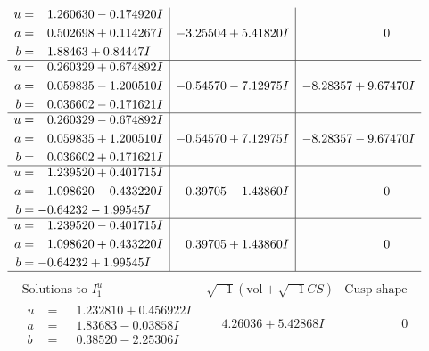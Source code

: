 \documentclass[1p]{elsarticle_modified}
\theoremstyle{definition}
\newcommand{\I}{\sqrt{-1}}
\begin{document}
$$\begin{array}{c|c|c}
\begin{aligned}
u &= \phantom{-}1.260630 - 0.174920 I \\
a &= \phantom{-}0.502698 + 0.114267 I \\
b &= \phantom{-}1.88463 + 0.84447 I\end{aligned}
 & -3.25504 + 5.41820 I & \phantom{-0.000000 } 0 \\ \hline\begin{aligned}
u &= \phantom{-}0.260329 + 0.674892 I \\
a &= \phantom{-}0.059835 - 1.200510 I \\
b &= \phantom{-}0.036602 - 0.171621 I\end{aligned}
 & -0.54570 - 7.12975 I & -8.28357 + 9.67470 I \\ \hline\begin{aligned}
u &= \phantom{-}0.260329 - 0.674892 I \\
a &= \phantom{-}0.059835 + 1.200510 I \\
b &= \phantom{-}0.036602 + 0.171621 I\end{aligned}
 & -0.54570 + 7.12975 I & -8.28357 - 9.67470 I \\ \hline\begin{aligned}
u &= \phantom{-}1.239520 + 0.401715 I \\
a &= \phantom{-}1.098620 - 0.433220 I \\
b &= -0.64232 - 1.99545 I\end{aligned}
 & \phantom{-}0.39705 - 1.43860 I & \phantom{-0.000000 } 0 \\ \hline\begin{aligned}
u &= \phantom{-}1.239520 - 0.401715 I \\
a &= \phantom{-}1.098620 + 0.433220 I \\
b &= -0.64232 + 1.99545 I\end{aligned}
 & \phantom{-}0.39705 + 1.43860 I & \phantom{-0.000000 } 0\\
 \hline 
 \end{array}$$\newpage$$\begin{array}{c|c|c}  
\text{Solutions to }I^u_{1}& \I (\text{vol} + \sqrt{-1}CS) & \text{Cusp shape}\\
 \hline 
\begin{aligned}
u &= \phantom{-}1.232810 + 0.456922 I \\
a &= \phantom{-}1.83683 - 0.03858 I \\
b &= \phantom{-}0.38520 - 2.25306 I\end{aligned}
 & \phantom{-}4.26036 + 5.42868 I & \phantom{-0.000000 } 0 \\ \hline\begin{aligned}

\end{aligned}
\end{array}$$
\end{document}
